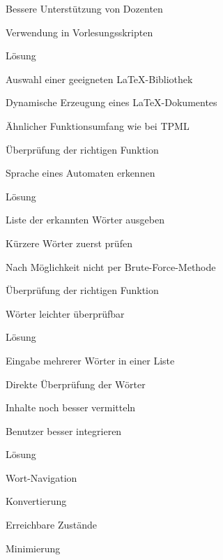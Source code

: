 {
    \begin{itemgroup}{}
	\item Bessere Unterstützung von Dozenten
	\item Verwendung in Vorlesungsskripten
    \end{itemgroup}

    \begin{itemgroup}{Lösung}
	\item Auswahl einer geeigneten \LaTeX-Bibliothek
	\item Dynamische Erzeugung eines \LaTeX-Dokumentes
	\item Ähnlicher Funktionsumfang wie bei TPML
	\end{itemgroup}
    
    \vfill{}
}


{
    \begin{itemgroup}{}
	\item Überprüfung der richtigen Funktion
	\item Sprache eines Automaten erkennen 
    \end{itemgroup}

    \begin{itemgroup}{Lösung}
	\item Liste der erkannten Wörter ausgeben
	\item Kürzere Wörter zuerst prüfen
	\item Nach Möglichkeit nicht per Brute-Force-Methode
	\end{itemgroup}
    
    \vfill{}
}


{
    \begin{itemgroup}{}
	\item Überprüfung der richtigen Funktion
	\item Wörter leichter überprüfbar
    \end{itemgroup}

    \begin{itemgroup}{Lösung}
	\item Eingabe mehrerer Wörter in einer Liste
	\item Direkte Überprüfung der Wörter
	\end{itemgroup}
    
    \vfill{}
}


{
    \begin{itemgroup}{}
	\item Inhalte noch besser vermitteln
	\item Benutzer besser integrieren
    \end{itemgroup}

    \begin{itemgroup}{Lösung}
	\item Wort-Navigation
	\item Konvertierung
	\item Erreichbare Zustände
	\item Minimierung
	\end{itemgroup}
    
    \vfill{}
}



